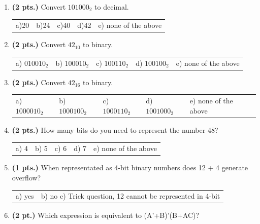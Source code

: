 \documentclass{article}
\begin{document}
\begin{enumerate}

\item {\bf (2 pts.)} Convert $101000_2$ to decimal.

\begin{tabular}{p{0.7in} p{0.7in} p{0.7in} p{0.7in} l}
a)20 & b)24  & c)40  & d)42  & e) none of the above
\end{tabular}

\item {\bf (2 pts.)} Convert $42_{10}$ to binary.

\begin{tabular}{p{0.7in} p{0.7in} p{0.7in} p{0.7in} l}
a) $010010_2$ & b) $100010_2$ & c) $100110_2$ & d) $100100_2$ & e) none of the above
\end{tabular}

\item {\bf (2 pts.)} Convert $42_{16}$ to binary.

\begin{tabular}{p{0.7in} p{0.7in} p{0.7in} p{0.7in} l}
a) $1000010_2$ & b) $1000100_2$ & c) $1000110_2$ & d) $1001000_2$ & e) none of the above
\end{tabular}

\item {\bf (2 pts.)} How many bits do you need to represent the number 48?

\begin{tabular}{p{0.7in} p{0.7in} p{0.7in} p{0.7in} l}
a) 4  & b) 5 & c) 6 & d) 7 & e) none of the above
\end{tabular}

\item {\bf (1 pts.)} When representated as 4-bit binary numbers does 12 + 4
generate overflow?

\begin{tabular}{p{0.7in} l}
a) yes & b) no  c) Trick question, 12 cannot be represented in 4-bit
\end{tabular}


\item {\bf (2 pt.)} Which expression is equivalent to (A'+B)'(B+AC)?


\end{enumerate}
\end{document}
